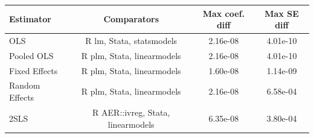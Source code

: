 \begin{tabular}{lccc}
\toprule
Estimator & Comparators & Max coef. diff & Max SE diff \\
\midrule
OLS & R lm, Stata, statsmodels & 2.16e-08 & 4.01e-10 \\
Pooled OLS & R plm, Stata, linearmodels & 2.16e-08 & 4.01e-10 \\
Fixed Effects & R plm, Stata, linearmodels & 1.60e-08 & 1.14e-09 \\
Random Effects & R plm, Stata, linearmodels & 2.16e-08 & 6.58e-04 \\
2SLS & R AER::ivreg, Stata, linearmodels & 6.35e-08 & 3.80e-04 \\
\bottomrule
\end{tabular}